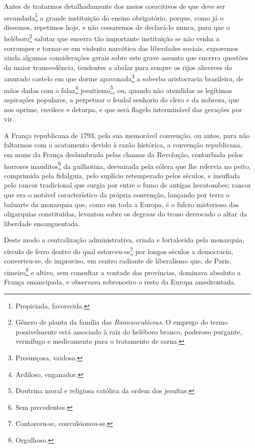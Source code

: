 \asterisc{}

Antes de tratarmos detalhadamente dos meios coercitivos de que deve ser
secundada\footnote{Propiciada, favorecida.} a grande instituição do
ensino obrigatório, porque, como já o dissemos, repetimos hoje, e não
cessaremos de declará-lo nunca, para que o heléboro\footnote{Gênero de
  planta da família das \emph{Raununculáceas}. O emprego do termo
  possivelmente está associado à raiz do heléboro branco, poderoso
  purgante, vermífugo e medicamento para o tratamento de sarna.} salutar
que encerra tão importante instituição se não venha a corromper e
tornar-se em violento narcótico das liberdades sociais, exporemos ainda
algumas considerações gerais sobre este grave assunto que encerra
questões da maior transcedência, tendentes a abalar para sempre os rijos
alicerces do amurado castelo em que dorme apavonada\footnote{
  Presunçosa, vaidosa.} a soberba aristocracia brasileira, de mãos dadas
com o falaz\footnote{Ardiloso, enganador.} jesuitismo\footnote{
  Doutrina moral e religiosa católica da ordem dos jesuítas.}, ou,
quando não atendidas as legítimas aspirações populares, a perpetuar o
feudal senhorio do clero e da nobreza, que nos oprime, envilece e
deturpa, e que será flagelo interminável das gerações por vir.

A França republicana de 1793, pela sua memorável convenção, ou antes,
para não faltarmos com o acatamento devido à razão histórica, a
convenção republicana, em nome da França deslumbrada pelas chamas da
Revolução, conturbada pelos horrores inauditos\footnote{Sem
  precedentes.} da guilhotina, desvairada pela cólera que lhe refervia
no peito, comprimida pela fidalguia, pelo suplício retemperado pelos
séculos, e insuflada pelo rancor tradicional que surgia por entre o fumo
de antigas hecatombes; rancor que era o notável característico da
própria convenção, lançando por terra o baluarte da monarquia que, como
em toda a Europa, é o fulcro misterioso das oligarquias constituídas,
levantou sobre os degraus do trono derrocado o altar da liberdade
ensanguentada.

Deste modo a centralização administrativa, criada e fortalecida pela
monarquia, círculo de ferro dentro do qual estorceu-se\footnote{
  Contorceu-se, convulsionou-se.} por longos séculos a democracia,
converteu-se, de improviso, em centro radiante de liberalismo que, de
Paris, cimeiro\footnote{Orgulhoso.} e altivo, sem consultar a vontade
das províncias, dominava absoluto a França emancipada, e observava
sobrenceiro o resto da Europa amedrontada.

